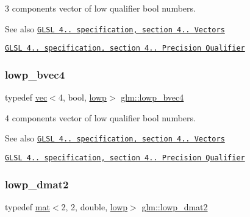 3 components vector of low qualifier bool numbers.

\begin{DoxySeeAlso}{See also}
\href{http://www.opengl.org/registry/doc/GLSLangSpec.4.20.8.pdf}{\tt G\+L\+SL 4.. specification, section 4.. Vectors} 

\href{http://www.opengl.org/registry/doc/GLSLangSpec.4.20.8.pdf}{\tt G\+L\+SL 4.. specification, section 4.. Precision Qualifier} 
\end{DoxySeeAlso}
\mbox{\label{group__core__precision_ga9c156bdb6dd02d35826ee77094ff3cdf}} 
\subsubsection{\texorpdfstring{lowp\+\_\+bvec4}{lowp\_bvec4}}
{\footnotesize\ttfamily typedef \mbox{\hyperlink{structglm_1_1vec}{vec}}$<$4, bool, \mbox{\hyperlink{namespaceglm_a36ed105b07c7746804d7fdc7cc90ff25ae161af3fc695e696ce3bf69f7332bc2d}{lowp}}$>$ \mbox{\hyperlink{group__core__precision_ga9c156bdb6dd02d35826ee77094ff3cdf}{glm\+::lowp\+\_\+bvec4}}}

4 components vector of low qualifier bool numbers.

\begin{DoxySeeAlso}{See also}
\href{http://www.opengl.org/registry/doc/GLSLangSpec.4.20.8.pdf}{\tt G\+L\+SL 4.. specification, section 4.. Vectors} 

\href{http://www.opengl.org/registry/doc/GLSLangSpec.4.20.8.pdf}{\tt G\+L\+SL 4.. specification, section 4.. Precision Qualifier} 
\end{DoxySeeAlso}
\mbox{\label{group__core__precision_gaf2d0890fdba0e76d2bd2a169c1a71b00}} 
\subsubsection{\texorpdfstring{lowp\+\_\+dmat2}{lowp\_dmat2}}
{\footnotesize\ttfamily typedef \mbox{\hyperlink{structglm_1_1mat}{mat}}$<$2, 2, double, \mbox{\hyperlink{namespaceglm_a36ed105b07c7746804d7fdc7cc90ff25ae161af3fc695e696ce3bf69f7332bc2d}{lowp}}$>$ \mbox{\hyperlink{group__core__precision_gaf2d0890fdba0e76d2bd2a169c1a71b00}{glm\+::lowp\+\_\+dmat2}}}

